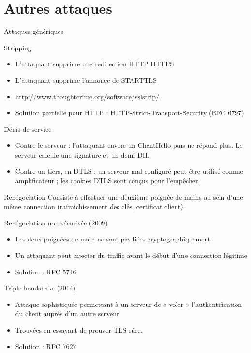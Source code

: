 \documentclass{mpg-ep-slides}
\begin{document}
\section[Attaques]{Autres attaques}
\tocsect

\begin{frame}{Attaques génériques}
  \begin{block}{Stripping}
    \begin{itemize}
      \item L'attaquant supprime une redirection HTTP \textrightarrow HTTPS
      \item L'attaquant supprime l'annonce de STARTTLS
      \item \url{http://www.thoughtcrime.org/software/sslstrip/}
      \item Solution partielle pour HTTP : HTTP-Strict-Transport-Security (RFC
        6797)
    \end{itemize}
  \end{block}

  \begin{block}{Dénis de service}
    \begin{itemize}
      \item Contre le serveur : l'attaquant envoie un ClientHello puis ne
        répond plus. Le serveur calcule une signature et un demi DH.
      \item Contre un tiers, en DTLS : un serveur mal configuré peut être
        utilisé comme amplificateur ; les cookies DTLS sont conçus pour
        l'empêcher.
    \end{itemize}
  \end{block}
\end{frame}

\begin{frame}{Renégociation}
  Consiste à effectuer une deuxième poignée de mains au sein d'une même
  connection (rafraichissement des clés, certificat client).

  \begin{block}{Renégociation non sécurisée (2009)}
    \begin{itemize}
      \item Les deux poignées de main ne sont pas liées cryptographiquement
      \item Un attaquant peut injecter du traffic avant le début d'une
        connection légitime
      \item Solution : RFC 5746
    \end{itemize}
  \end{block}

  \begin{block}{Triple handshake (2014)}
    \begin{itemize}
      \item Attaque sophistiquée permettant à un serveur de «
        voler » l'authentification du client auprès d'un autre serveur
      \item Trouvées en essayant de prouver TLS sûr\dots
      \item Solution : RFC 7627
    \end{itemize}
  \end{block}
\end{frame}
\end{document}
